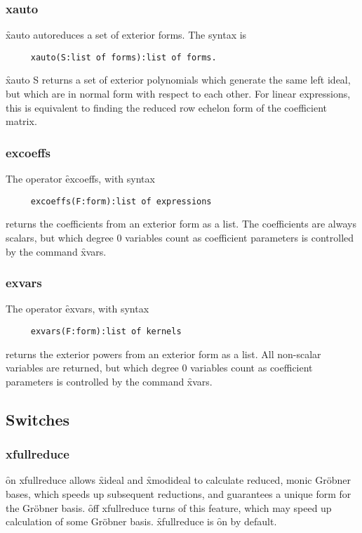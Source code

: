\subsubsection*{xauto}

\f{xauto} autoreduces a set of exterior forms. The syntax is
\begin{verbatim}
     xauto(S:list of forms):list of forms.
\end{verbatim}
\f{xauto S} returns a set of exterior polynomials which generate the same
left ideal, but which are in normal form with respect to each other. For
linear expressions, this is equivalent to finding the reduced row echelon
form of the coefficient matrix.


\subsubsection*{excoeffs}

The operator \f{excoeffs}, with syntax
\begin{verbatim}
     excoeffs(F:form):list of expressions
\end{verbatim}
returns the coefficients from an exterior form as a list. The coefficients
are always scalars, but which degree 0 variables count as coefficient
parameters is controlled by the command \f{xvars}.


\subsubsection*{exvars}

The operator \f{exvars}, with syntax
\begin{verbatim}
     exvars(F:form):list of kernels
\end{verbatim}
returns the exterior powers from an exterior form as a list. All non-scalar
variables are returned, but which degree 0 variables count as coefficient
parameters is controlled by the command \f{xvars}.


\subsection{Switches} 


\subsubsection*{xfullreduce}

\f{on xfullreduce} allows \f{xideal} and \f{xmodideal} to calculate
reduced, monic Gr{\"o}bner bases, which speeds up subsequent reductions, and
guarantees a unique form for the Gr{\"o}bner basis. \f{off xfullreduce} turns
of this feature, which may speed up calculation of some Gr{\"o}bner
basis. \f{xfullreduce} is \f{on} by default.


